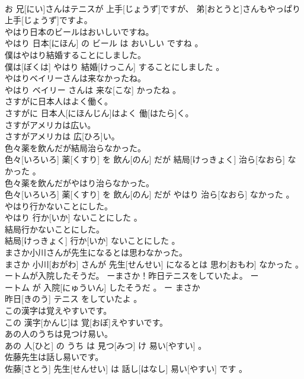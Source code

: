 \documentclass[8pt]{extreport}
\begin{document}
\begin{CJK}{UTF8}{min}
\\	お 兄[にい]さんはテニスが 上手[じょうず]ですが、 弟[おとうと]さんもやっぱり 上手[じょうず]ですよ。
\\	やはり日本のビールはおいしいですね。	
\\	やはり 日本[にほん] の ビール は おいしい ですね 。
\\	僕はやはり結婚することにしました。	
\\	僕は[ぼくは] やはり 結婚[けっこん] することにしました 。
\\	やはりベイリーさんは来なかったね。	
\\	やはり ベイリー さんは 来な[こな] かったね 。
\\	さすがに日本人はよく働く。	
\\	さすがに 日本人[にほんじん]はよく 働[はたら]く。
\\	さすがアメリカは広い。	
\\	さすがアメリカは 広[ひろ]い。
\\	色々薬を飲んだが結局治らなかった。	
\\	色々[いろいろ] 薬[くすり] を 飲ん[のん] だが 結局[けっきょく] 治ら[なおら] なかった 。
\\	色々薬を飲んだがやはり治らなかった。	
\\	色々[いろいろ] 薬[くすり] を 飲ん[のん] だが やはり 治ら[なおら] なかった 。
\\	やはり行かないことにした。	
\\	やはり 行か[いか] ないことにした 。
\\	結局行かないことにした。	
\\	結局[けっきょく] 行か[いか] ないことにした 。
\\	まさか小川さんが先生になるとは思わなかった。	
\\	まさか 小川[おがわ] さんが 先生[せんせい] になるとは 思わ[おもわ] なかった 。
\\	ートムが入院したそうだ。 ーまさか！昨日テニスをしていたよ。	ー
\\	ートム が 入院[にゅういん] したそうだ 。 ー まさか 
\\	昨日[きのう] テニス をしていたよ 。
\\	この漢字は覚えやすいです。	
\\	この 漢字[かんじ]は 覚[おぼ]えやすいです。
\\	あの人のうちは見つけ易い。	
\\	あの 人[ひと] の うち は 見つ[みつ] け 易い[やすい] 。
\\	佐藤先生は話し易いです。	
\\	佐藤[さとう] 先生[せんせい] は 話し[はなし] 易い[やすい] です 。

\end{CJK}
\end{document}
